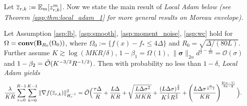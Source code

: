 \documentclass{article} %
\numberwithin{equation}{section}
\renewcommand{\eqref}[1]{(\ref{#1})}
\begin{document}
    Let $\overline{z}_{r,k}:=\mathbb{E}_m [z_{r,k}^m]$. Now we state the main result of \em Local \em Adam below (see Theorem \ref{app:thm:local_adam_1} for more general results on Moreau envelope). 

\begin{thm}\label{thm:local_adam}
    Let Assumption \ref{asp:lb}, \ref{asp:smooth}, \ref{asp:moment_noise}, \ref{asp:wc} hold for $\Omega=\mbox{\bf conv}(\mbox{\bf B}_{R_0}(\Omega_0))$, where $\Omega_0:=\{f(x) - f_*\leq 4\Delta\}$ and $R_0=\sqrt{\Delta/(80L)}$. 
    Further assume $K\gtrsim \log (MKR/\delta)$, $1-\beta_1=\Omega(1)$, $\|\boldsymbol{\sigma}\|_{2\alpha}d^{\frac{1}{2}-\frac{1}{2\alpha}}=\mathcal{O}(\sigma)$ and $1-\beta_2 = \Tilde{\mathcal{O}} (K^{-3/2}R^{-1/2})$.
    Then with probability no less than $1-\delta$, \em Local \em Adam yields 
    \begin{equation}\label{eq:grad_bound_local_adam}
        \begin{aligned}
            &\frac{\lambda}{KR}\sum_{r=0}^{R-1}\sum_{k=0}^{K-1}\|\nabla f (\overline{z}_{r,k}) \|_{H_r^{-1}}^2
            = \Tilde{\mathcal{O}}\Big(\frac{\tau\Delta}{R} + \frac{L\Delta}{KR} + \sqrt{\frac{L\Delta\sigma^2}{MKR}} + \frac{(L\Delta\sigma)^{\frac{2}{3}}}{K^{\frac{1}{3}}R^{\frac{2}{3}}} + \left(\frac{L\Delta\sigma^{\frac{\alpha}{\alpha-1}}}{KR}\right)^{\frac{2(\alpha-1)}{3\alpha-2}}\Big).
        \end{aligned}
    \end{equation}
\end{thm}

\end{document}
